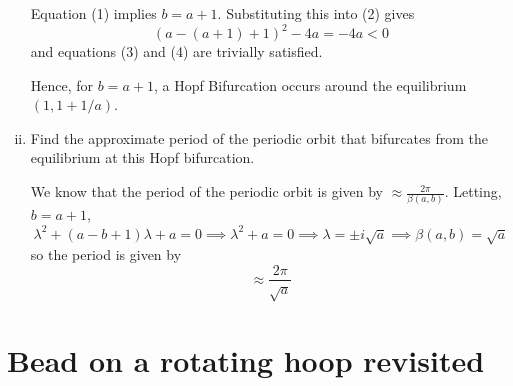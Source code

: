 \documentclass[12pt]{article}
\begin{document}
\begin{enumerate}[(i)]
          Equation (1) implies $b = a+1$. Substituting this into (2) gives
          \[(a - (a + 1) + 1)^2 - 4a = -4a < 0\]
          and equations (3) and (4) are trivially satisfied.

          Hence, for $\boxed{b = a + 1}$, a Hopf Bifurcation occurs around the equilibrium $(1, 1+1/a)$.


          \color{black}

    \item Find the approximate period of the periodic orbit that bifurcates from the equilibrium at this Hopf bifurcation.

          \color{blue}
          We know that the period of the periodic orbit is given by $\approx \frac{2\pi}{\beta(a, b)}$. Letting, $b = a + 1$,
          \[\lambda^2 + (a - b + 1)\lambda + a = 0 \implies \lambda^2 + a = 0 \implies \lambda = \pm i \sqrt{a} \implies \beta(a, b) = \sqrt{a}\]
          so the period is given by
          \[\boxed{\approx \frac{2\pi}{\sqrt a}}\]

          \color{black}
\end{enumerate}

\pagebreak


\section{Bead on a rotating hoop revisited}
\end{document}
